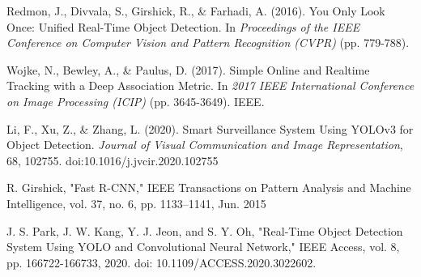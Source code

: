 \documentclass[openany,12pt]{report}
\begin{document}
\begin{thebibliography}{9}

Redmon, J., Divvala, S., Girshick, R., \& Farhadi, A. (2016). You Only Look Once: Unified Real-Time Object Detection. In \textit{Proceedings of the IEEE Conference on Computer Vision and Pattern Recognition (CVPR)} (pp. 779-788).

Wojke, N., Bewley, A., \& Paulus, D. (2017). Simple Online and Realtime Tracking with a Deep Association Metric. In \textit{2017 IEEE International Conference on Image Processing (ICIP)} (pp. 3645-3649). IEEE.

Li, F., Xu, Z., \& Zhang, L. (2020). Smart Surveillance System Using YOLOv3 for Object Detection. \textit{Journal of Visual Communication and Image Representation}, 68, 102755. doi:10.1016/j.jvcir.2020.102755


 R. Girshick, "Fast R-CNN," IEEE Transactions on Pattern Analysis and Machine Intelligence, vol. 37, no. 6, pp. 1133–1141, Jun. 2015

 J. S. Park, J. W. Kang, Y. J. Jeon, and S. Y. Oh, "Real-Time Object Detection System Using YOLO and Convolutional Neural Network," IEEE Access, vol. 8, pp. 166722-166733, 2020. doi: 10.1109/ACCESS.2020.3022602.
\end{thebibliography}
\end{document}
